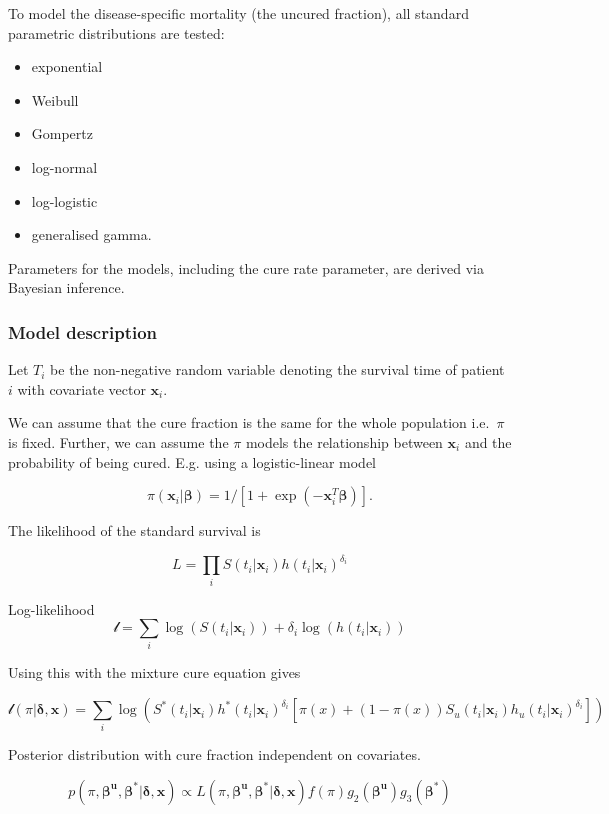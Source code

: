 \documentclass[
]{article}
\providecommand{\tightlist}{%
  \setlength{\itemsep}{0pt}\setlength{\parskip}{0pt}}
\begin{document}
To model the disease-specific mortality (the uncured fraction), all
standard parametric distributions are tested:

\begin{itemize}
\tightlist
\item
  exponential
\item
  Weibull
\item
  Gompertz
\item
  log-normal
\item
  log-logistic
\item
  generalised gamma.
\end{itemize}

Parameters for the models, including the cure rate parameter, are
derived via Bayesian inference.

\hypertarget{model-description}{%
\subsubsection{Model description}\label{model-description}}

Let \(T_i\) be the non-negative random variable denoting the survival
time of patient \(i\) with covariate vector \(\boldsymbol{x}_i\).

We can assume that the cure fraction is the same for the whole
population i.e.~\(\pi\) is fixed. Further, we can assume the \(\pi\)
models the relationship between \(\boldsymbol{x}_i\) and the probability
of being cured. E.g. using a logistic-linear model

\[
\pi(\boldsymbol{x}_i | \boldsymbol{\beta}) = 1/[1 + \exp(-\boldsymbol{x}_i^T \boldsymbol{\beta})].
\]

The likelihood of the standard survival is

\[
L = \prod_i S(t_i | \boldsymbol{x}_i) h(t_i | \boldsymbol{x}_i)^{\delta_i}
\]

Log-likelihood \[
\mathcal{l} = \sum_i \log(S(t_i | \boldsymbol{x}_i)) + \delta_i \log(h(t_i | \boldsymbol{x}_i))
\]

Using this with the mixture cure equation gives

\[
\mathcal{l}(\pi | \boldsymbol{\delta}, \boldsymbol{x}) =
 \sum_i \log(S^*(t_i | \boldsymbol{x}_i) h^*(t_i | \boldsymbol{x}_i)^{\delta_i}[\pi(x) +
   (1 − \pi(x)) S_u(t_i | \boldsymbol{x}_i) h_u(t_i | \boldsymbol{x}_i)^{\delta_i}])
\]

Posterior distribution with cure fraction independent on covariates.

\[
p(\pi, \boldsymbol{\beta^u}, \boldsymbol{\beta^*} | \boldsymbol{\delta}, \boldsymbol{x}) \propto L(\pi, \boldsymbol{\beta^u}, \boldsymbol{\beta^*} | \boldsymbol{\delta}, \boldsymbol{x}) f(\pi) g_2(\boldsymbol{\beta^u}) g_3(\boldsymbol{\beta^*})
\]
\end{document}
